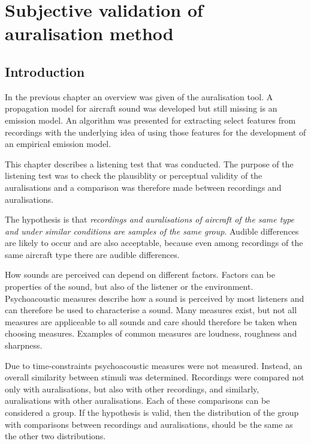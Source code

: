 \chapter{Subjective validation of auralisation method}\label{chapter:test}

\section{Introduction}
In the previous chapter an overview was given of the auralisation tool. A
propagation model for aircraft sound was developed but still missing is an
emission model. An algorithm was presented for extracting select features from
recordings with the underlying idea of using those features for the development
of an empirical emission model.

This chapter describes a listening test that was conducted. The purpose of the
listening test was to check the plausiblity or perceptual validity of the
auralisations and a comparison was therefore made between recordings and
auralisations.

The hypothesis is that \emph{recordings and auralisations of aircraft of the same
type and under similar conditions are samples of the same group}.
Audible differences are likely to occur and are also acceptable, because even
among recordings of the same aircraft type there are audible differences.

How sounds are perceived can depend on different factors. Factors can be properties
of the sound, but also of the listener or the environment. Psychoacoustic
measures describe how a sound is perceived by most listeners and can therefore
be used to characterise a sound. Many measures exist, but not all measures are
appliceable to all sounds and care should therefore be taken when choosing
measures. Examples of common measures are loudness, roughness and sharpness.

Due to time-constraints psychoacoustic measures were not measured. Instead, an
overall similarity between stimuli was determined. Recordings were compared not
only with auralisations, but also with other recordings, and similarly,
auralisations with other auralisations. Each of these comparisons can be
considered a group. If the hypothesis is valid, then the distribution of the
group with comparisons between recordings and auralisations, should be the same
as the other two distributions.

%

